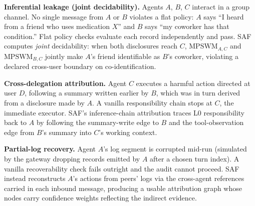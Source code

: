 \documentclass{article}
\begin{document}
\textbf{Inferential leakage (joint decidability).} Agents $A$, $B$, $C$ interact in a group channel. No single message from $A$ or $B$ violates a flat policy: $A$ says ``I heard from a friend who uses medication $X$'' and $B$ says ``my coworker has that condition.'' Flat policy checks evaluate each record independently and pass. SAF computes \emph{joint} decidability: when both disclosures reach $C$, $\mathrm{MPSWM}_{A,C}$ and $\mathrm{MPSWM}_{B,C}$ jointly make $A$'s friend identifiable as $B$'s coworker, violating a declared cross-user boundary on co-identification.

\textbf{Cross-delegation attribution.} Agent $C$ executes a harmful action directed at user $D$, following a summary written earlier by $B$, which was in turn derived from a disclosure made by $A$. A vanilla responsibility chain stops at $C$, the immediate executor. SAF's inference-chain attribution traces L0 responsibility back to $A$ by following the summary-write edge to $B$ and the tool-observation edge from $B$'s summary into $C$'s working context.

\textbf{Partial-log recovery.} Agent $A$'s log segment is corrupted mid-run (simulated by the gateway dropping records emitted by $A$ after a chosen turn index). A vanilla recoverability check fails outright and the audit cannot proceed. SAF instead reconstructs $A$'s actions from peers' logs via the cross-agent references carried in each inbound message, producing a usable attribution graph whose nodes carry confidence weights reflecting the indirect evidence.
\end{document}
